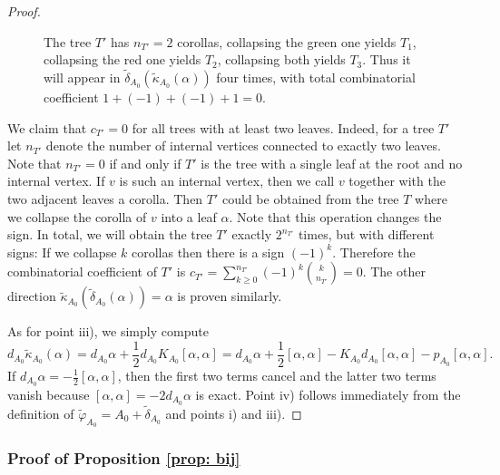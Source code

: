 \documentclass[11pt,a4paper]{amsart}
\theoremstyle{plain} %
\theoremstyle{definition}
\theoremstyle{remark}
\newcommand{\dd}{d}
\newcommand{\til}{\widetilde}
\begin{document}
\begin{proof}
\begin{figure}
     \caption{The tree $T'$ has $n_{T'} = 2 $ corollas, collapsing the green one yields $T_1$, collapsing the red one yields $T_2$, collapsing both yields $T_3$. Thus it will appear in $\til\delta_{A_0}(\til{\kappa}_{A_0}(\alpha))$ four times, with total combinatorial coefficient $1 + (-1) + (-1) + 1 = 0$.}
     \label{fig: two trees}
 \end{figure}We claim that $c_{T'} = 0$ for all trees with at least two leaves. Indeed, for a tree $T'$ let $n_{T'}$ denote the number of internal vertices connected to exactly two leaves. Note that $n_{T'} = 0$ if and only if $T'$ is the tree with a single leaf at the root and no internal vertex. If $v$ is such an internal vertex, then we call $v$ together with the two adjacent leaves a corolla. Then $T'$ could be obtained from the tree $T$ where we collapse the corolla of $v$ into a leaf $\alpha$. Note that this operation changes the sign. In total, we will obtain the tree $T'$ exactly $2^{n_{T'}}$ times, but with different signs: If we collapse $k$ corollas then there is a sign $(-1)^k$. Therefore the combinatorial coefficient of $T'$ is $c_{T'} = \sum_{k \geq 0}^{n_{T'}}(-1)^k{k \choose {n_{T'}}} = 0$. The other direction $\til\kappa_{A_0}(\til{\delta}_{A_0}(\alpha)) = \alpha$ is proven similarly. 

 As for point iii), we simply compute 
 $$\dd_{A_0}{\til\kappa_{A_0}}(\alpha) = d_{A_0}\alpha + \frac12 \dd_{A_0}K_{A_0}[\alpha,\alpha] = \dd_{A_0}\alpha + \frac12[\alpha,\alpha] - K_{A_0}\dd_{A_0}[\alpha,\alpha] - p_{A_0}[\alpha,\alpha].$$
 If $\dd_{A_0}\alpha = -\frac12[\alpha,\alpha]$, then the first two terms cancel and the latter two terms vanish because $[\alpha,\alpha] = -2d_{A_0}\alpha$ is exact. 
 Point iv) follows immediately from the definition of $\til\varphi_{A_0} = A_0 + \til\delta_{A_0}$ and points i) and iii). 
\end{proof}
\subsubsection{Proof of Proposition \ref{prop: bij}}\label{app: proofs 2}
\end{document}
